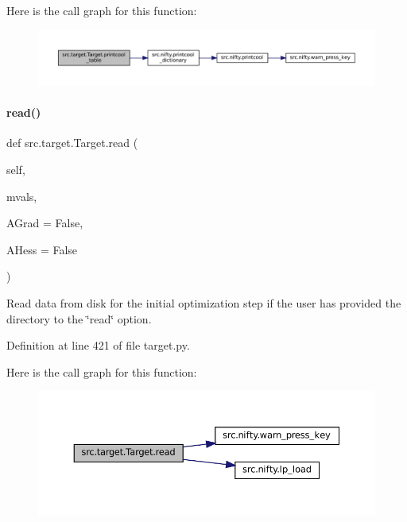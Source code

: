 Here is the call graph for this function\+:
\nopagebreak
\begin{figure}[H]
\begin{center}
\leavevmode
\includegraphics[width=350pt]{classsrc_1_1target_1_1Target_aa6d59de5918c58d75a9f23eb1c5bff39_cgraph}
\end{center}
\end{figure}
\mbox{\label{classsrc_1_1target_1_1Target_ae3ca02da2e52ece9a6f8d48203cc245e}} 
\paragraph{\texorpdfstring{read()}{read()}}
{\footnotesize\ttfamily def src.\+target.\+Target.\+read (\begin{DoxyParamCaption}\item[{}]{self,  }\item[{}]{mvals,  }\item[{}]{A\+Grad = {\ttfamily False},  }\item[{}]{A\+Hess = {\ttfamily False} }\end{DoxyParamCaption})}



Read data from disk for the initial optimization step if the user has provided the directory to the \char`\"{}read\char`\"{} option. 



Definition at line 421 of file target.\+py.

Here is the call graph for this function\+:
\nopagebreak
\begin{figure}[H]
\begin{center}
\leavevmode
\includegraphics[width=350pt]{classsrc_1_1target_1_1Target_ae3ca02da2e52ece9a6f8d48203cc245e_cgraph}
\end{center}
\end{figure}
\mbox{\label{classsrc_1_1target_1_1Target_a606efa8b4e93982266468373c809e36a}} 
